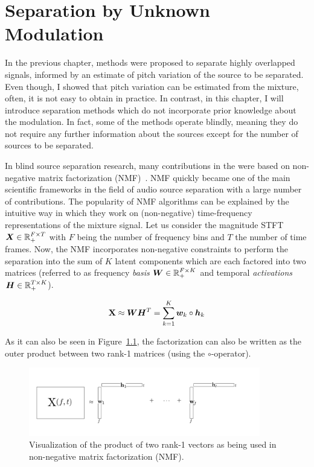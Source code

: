 \chapter{Separation by Unknown Modulation}
\label{cha:unknown}

In the previous chapter, methods were proposed to separate highly overlapped signals, informed by an estimate of pitch variation of the source to be separated.
Even though, I showed that pitch variation can be estimated from the mixture, often, it is not easy to obtain in practice.
In contrast, in this chapter, I will introduce separation methods which do not incorporate prior knowledge about the modulation. 
In fact, some of the methods operate blindly, meaning they do not require any further information about the sources except for the number of sources to be separated.
\par
In blind source separation research, many contributions in the were based on non-negative matrix factorization (NMF)~\cite{lee99, lee01}.
NMF quickly became one of the main scientific frameworks in the field of audio source separation with a large number of contributions.
The popularity of NMF algorithms can be explained by the intuitive way in which they work on (non-negative) time-frequency representations of the mixture signal.
Let us consider the magnitude STFT \({\bm{X}} \in {\mathbb{R}}_{+}^{F \times T}\) with \(F\) being the number of frequency bins and \(T\) the number of time frames.
Now, the NMF incorporates non-negative constraints to perform the separation into the sum of \(K\) latent components which are each factored into two matrices (referred to as frequency \emph{basis} \({\bm{W}} \in {\mathbb{R}}_{+}^ { F \times K }\) and temporal \emph{activations} \({\bm{H}} \in {\mathbb{R}}_{+}^ { T \times K }\)). 

\begin{equation}
   \mathbf{X} \approx {\bm{W}} {\bm{H}}^{T} = \sum\limits_{k=1}^{K} {\bm{w}}_{k} \circ {\bm{h}}_{k}
   \label{eq:vanilla_nmf}
\end{equation}

As it can also be seen in Figure~\ref{fig:nmf}, the factorization can also be written as the outer product between two rank-1 matrices (using the \(\circ\)-operator).

\begin{figure}[t]
  \centering
  \includegraphics[width=0.9\textwidth]{Chapters/06_Separation_Unknown/figures/nmf.pdf}
  \caption{Visualization of the product of two rank-1 vectors as being used in non-negative matrix factorization (NMF).}
  \label{fig:nmf}
\end{figure}


